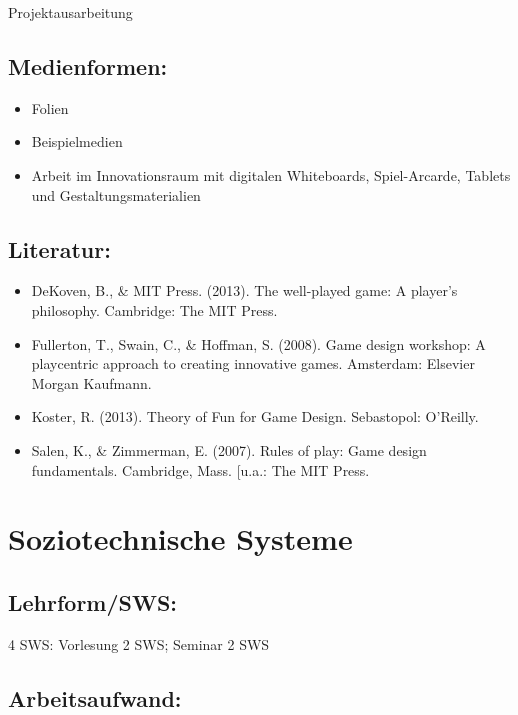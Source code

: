 Projektausarbeitung

\section*{Medienformen:}\label{medienformen-12}

\begin{itemize}
\item
  Folien
\item
  Beispielmedien
\item
  Arbeit im Innovationsraum mit digitalen Whiteboards, Spiel-Arcarde,
  Tablets und Gestaltungsmaterialien
\end{itemize}

\section*{Literatur:}\label{literatur-19}

\begin{itemize}
\item
  DeKoven, B., \& MIT Press. (2013). The well-played game: A player's
  philosophy. Cambridge: The MIT Press.
\item
  Fullerton, T., Swain, C., \& Hoffman, S. (2008). Game design workshop:
  A playcentric approach to creating innovative games. Amsterdam:
  Elsevier Morgan Kaufmann.
\item
  Koster, R. (2013). Theory of Fun for Game Design. Sebastopol:
  O'Reilly.
\item
  Salen, K., \& Zimmerman, E. (2007). Rules of play: Game design
  fundamentals. Cambridge, Mass. {[}u.a.: The MIT Press.
\end{itemize}

\chapter{Soziotechnische Systeme}\label{soziotechnische-systeme}

\section*{Lehrform/SWS:}\label{lehrformsws-20}

4 SWS: Vorlesung 2 SWS; Seminar 2 SWS

\section*{Arbeitsaufwand:}\label{arbeitsaufwand-16}

